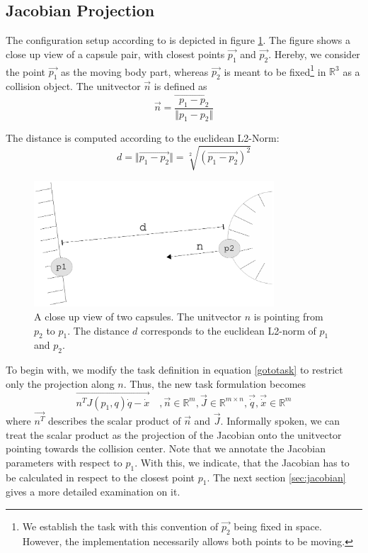 \subsection{Jacobian Projection}
The configuration setup according to \cite{Faverjon87alocal} is depicted in figure \ref{figcapsuledistance}. The figure shows a close up view of a capsule pair, with closest points $\vec{p_1}$ and $\vec{p_2}$. Hereby, we consider the point $\vec{p_1}$ as the moving body part, whereas $\vec{p_2}$ is meant to be fixed\footnote{We establish the task with this convention of $\vec{p_2}$ being fixed in space. However, the implementation necessarily allows both points to be moving.} in $\mathbb{R}^3$ as a collision object. The unitvector $\vec{n}$ is defined as
\begin{equation}
	\vec{n} = \vec{\frac{p_1-p_2}{\Vert p_1 - p_2 \Vert}}
\end{equation}

The distance is computed according to the euclidean L2-Norm:
\begin{equation}
	d = \Vert \vec{p_1-p_2} \Vert = \sqrt[2]{(\vec{p_1-p_2})^2}
\end{equation}

\begin{figure}[h!]
  \centering
    \includegraphics[width=0.8\textwidth]{../figures/capsuledistance.eps}
    \caption{A close up view of two capsules. The unitvector $n$ is pointing from $p_2$ to $p_1$. The distance $d$ corresponds to the euclidean L2-norm of $p_1$ and $p_2$.}
    \label{figcapsuledistance}
\end{figure}

To begin with, we modify the task definition in equation \ref{gototask} to restrict only the projection along $n$. Thus, the new task formulation becomes
\begin{equation}\label{gototaskn}
\vec{n^TJ(p_1,q) \dot{q} - \dot{x}} \quad ,\vec{n} \in \mathbb{R}^m, \vec{J} \in \mathbb{R}^{m \times n}, \vec{\dot{q}} , \vec{\dot{x}} \in \mathbb{R}^{m}
\end{equation}
where $\vec{n^T}$ describes the scalar product of $\vec{n}$ and $\vec{J}$. Informally spoken, we can treat the scalar product as the projection of the Jacobian onto the unitvector pointing towards the collision center. Note that we annotate the Jacobian parameters with respect to $p_1$. With this, we indicate, that the Jacobian has to be calculated in respect to the closest point $p_1$. The next section \ref{sec:jacobian} gives a more detailed examination on it.

